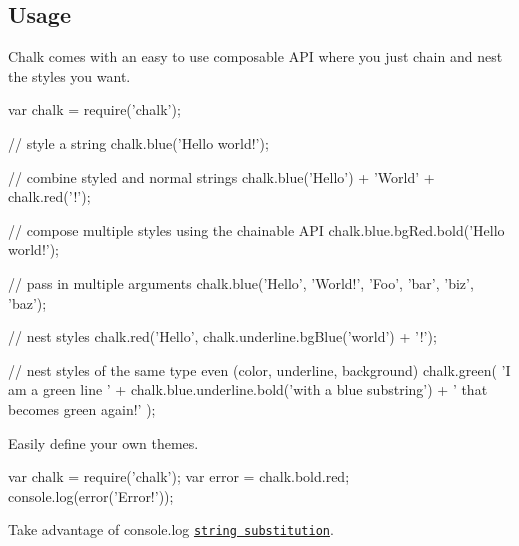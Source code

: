 

\subsection*{Usage}

Chalk comes with an easy to use composable A\+P\+I where you just chain and nest the styles you want.


\begin{DoxyCode}
var chalk = require(\textcolor{stringliteral}{'chalk'});

\textcolor{comment}{// style a string}
chalk.blue(\textcolor{stringliteral}{'Hello world!'});

\textcolor{comment}{// combine styled and normal strings}
chalk.blue(\textcolor{stringliteral}{'Hello'}) + \textcolor{stringliteral}{'World'} + chalk.red(\textcolor{charliteral}{'!'});

\textcolor{comment}{// compose multiple styles using the chainable API}
chalk.blue.bgRed.bold(\textcolor{stringliteral}{'Hello world!'});

\textcolor{comment}{// pass in multiple arguments}
chalk.blue(\textcolor{stringliteral}{'Hello'}, \textcolor{stringliteral}{'World!'}, \textcolor{stringliteral}{'Foo'}, \textcolor{stringliteral}{'bar'}, \textcolor{stringliteral}{'biz'}, \textcolor{stringliteral}{'baz'});

\textcolor{comment}{// nest styles}
chalk.red(\textcolor{stringliteral}{'Hello'}, chalk.underline.bgBlue(\textcolor{stringliteral}{'world'}) + \textcolor{charliteral}{'!'});

\textcolor{comment}{// nest styles of the same type even (color, underline, background)}
chalk.green(
    \textcolor{stringliteral}{'I am a green line '} +
    chalk.blue.underline.bold(\textcolor{stringliteral}{'with a blue substring'}) +
    \textcolor{stringliteral}{' that becomes green again!'}
);
\end{DoxyCode}


Easily define your own themes.


\begin{DoxyCode}
var chalk = require(\textcolor{stringliteral}{'chalk'});
var error = chalk.bold.red;
console.log(error(\textcolor{stringliteral}{'Error!'}));
\end{DoxyCode}


Take advantage of console.\+log \href{http://nodejs.org/docs/latest/api/console.html#console_console_log_data}{\tt string substitution}.


